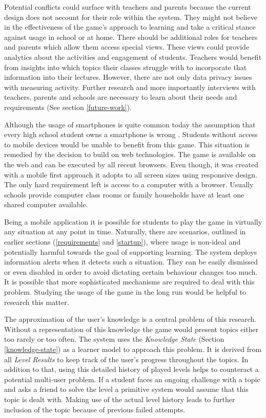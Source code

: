 Potential conflicts could surface with teachers and parents because the current design does not account for their role within the system. They might not believe in the effectiveness of the game's approach to learning and take a critical stance against usage in school or at home. There should be additional roles for teachers and parents which allow them access special views. These views could provide analytics about the activities and engagement of students. Teachers would benefit from insights into which topics their classes struggle with to incorporate that information into their lectures. However, there are not only data privacy issues with measuring activity. Further research and more importantly interviews with teachers, parents and schools are necessary to learn about their needs and requirements (See section \ref{future-work}).

Although the usage of smartphones is quite common today the assumption that every high school student owns a smartphone is wrong \cite{Lenhart2015TeensTeens}. Students without access to mobile devices would be unable to benefit from this game. This situation is remedied by the decision to build on web technologies. The game is available on the web and can be executed by all recent browsers. Even though, it was created with a mobile first approach it adopts to all screen sizes using responsive design. The only hard requirement left is access to a computer with a browser. Usually schools provide computer class rooms or family households have at least one shared computer available.

Being a mobile application it is possible for students to play the game in virtually any situation at any point in time. Naturally, there are scenarios, outlined in earlier sections (\ref{requirements} and \ref{startup}), where usage is non-ideal and potentially harmful towards the goal of supporting learning. The system deploys information alerts when it detects such a situation. They can be easily dismissed or even disabled in order to avoid dictating certain behaviour changes too much. It is possible that more sophisticated mechanisms are required to deal with this problem. Studying the usage of the game in the long run would be helpful to research this matter.

The approximation of the user's knowledge is a central problem of this research. Without a representation of this knowledge the game would present topics either too rarely or too often. The system uses the  \textit{Knowledge State} (Section \ref{knowledge-state}) as a learner model to approach this problem. It is derived from all \textit{Level Results} to keep track of the user's progress throughout the topics. In addition to that, using this detailed history of played levels helps to counteract a potential multi-user problem. If a student faces an ongoing challenge with a topic and asks a friend to solve the level a primitive system would assume that this topic is dealt with. Making use of the actual level history leads to further inclusion of the topic because of previous failed attempts.

